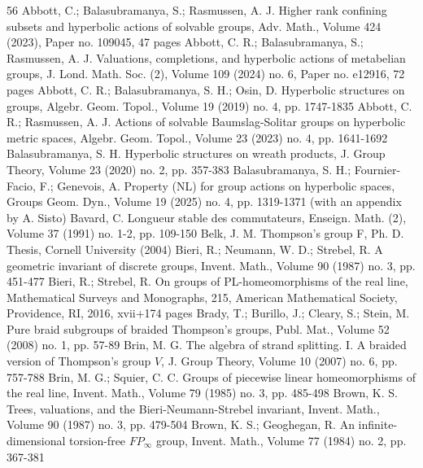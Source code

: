 \begin{thebibliography}{56}
Abbott, C.; Balasubramanya, S.; Rasmussen, A. J. Higher rank confining subsets and hyperbolic actions of solvable groups, Adv. Math., Volume 424 (2023), Paper no. 109045, 47 pages
Abbott, C. R.; Balasubramanya, S.; Rasmussen, A. J. Valuations, completions, and hyperbolic actions of metabelian groups, J. Lond. Math. Soc. (2), Volume 109 (2024) no. 6, Paper no. e12916, 72 pages
Abbott, C. R.; Balasubramanya, S. H.; Osin, D. Hyperbolic structures on groups, Algebr. Geom. Topol., Volume 19 (2019) no. 4, pp. 1747-1835
Abbott, C. R.; Rasmussen, A. J. Actions of solvable Baumslag-Solitar groups on hyperbolic metric spaces, Algebr. Geom. Topol., Volume 23 (2023) no. 4, pp. 1641-1692
Balasubramanya, S. H. Hyperbolic structures on wreath products, J. Group Theory, Volume 23 (2020) no. 2, pp. 357-383
Balasubramanya, S. H.; Fournier-Facio, F.; Genevois, A. Property (NL) for group actions on hyperbolic spaces, Groups Geom. Dyn., Volume 19 (2025) no. 4, pp. 1319-1371 (with an appendix by A. Sisto)
Bavard, C. Longueur stable des commutateurs, Enseign. Math. (2), Volume 37 (1991) no. 1-2, pp. 109-150
Belk, J. M. Thompson’s group F, Ph. D. Thesis, Cornell University (2004)
Bieri, R.; Neumann, W. D.; Strebel, R. A geometric invariant of discrete groups, Invent. Math., Volume 90 (1987) no. 3, pp. 451-477
Bieri, R.; Strebel, R. On groups of PL-homeomorphisms of the real line, Mathematical Surveys and Monographs, 215, American Mathematical Society, Providence, RI, 2016, xvii+174 pages
Brady, T.; Burillo, J.; Cleary, S.; Stein, M. Pure braid subgroups of braided Thompson’s groups, Publ. Mat., Volume 52 (2008) no. 1, pp. 57-89
Brin, M. G. The algebra of strand splitting. I. A braided version of Thompson’s group ${V}$, J. Group Theory, Volume 10 (2007) no. 6, pp. 757-788
Brin, M. G.; Squier, C. C. Groups of piecewise linear homeomorphisms of the real line, Invent. Math., Volume 79 (1985) no. 3, pp. 485-498
Brown, K. S. Trees, valuations, and the Bieri-Neumann-Strebel invariant, Invent. Math., Volume 90 (1987) no. 3, pp. 479-504
Brown, K. S.; Geoghegan, R. An infinite-dimensional torsion-free ${FP}_\infty $ group, Invent. Math., Volume 77 (1984) no. 2, pp. 367-381

\end{thebibliography}
